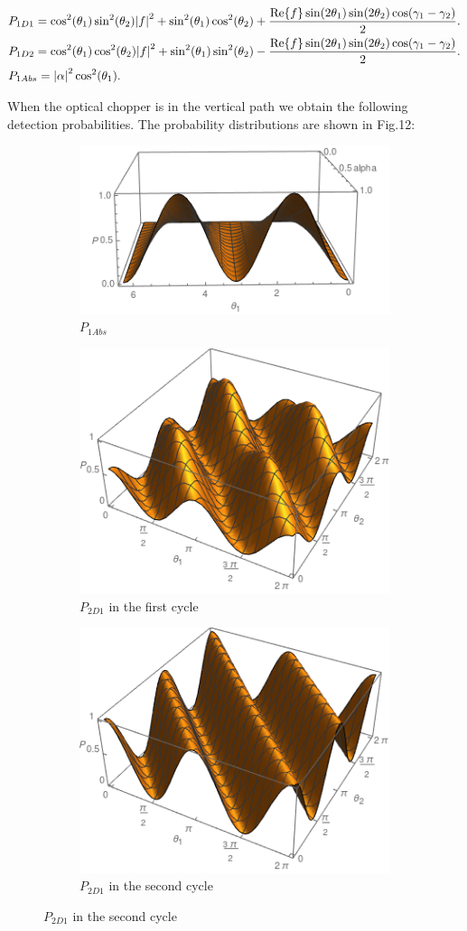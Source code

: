 \documentclass[12pt]{article}
\begin{document}
\begin{align}
&P_{1D1}=\cos^2(\theta_{1})\sin^2(\theta_{2})\abs{f}^2+ \sin^2(\theta_{1})\cos^2(\theta_{2})+\frac{\Re{f} \sin(2\theta_{1})\sin(2\theta_{2})\cos(\gamma_{1}-\gamma_{2})}{2}.\\
&P_{1D2}=\cos^2(\theta_{1})\cos^2(\theta_{2})\abs{f}^2+ \sin^2(\theta_{1})\sin^2(\theta_{2})-\frac{\Re{f} \sin(2\theta_{1})\sin(2\theta_{2})\cos(\gamma_{1}-\gamma_{2})}{2}.\\
&P_{1Abs}=\abs{\alpha}^2 \cos^2(\theta_{1}).
\end{align}


When the optical chopper is in the vertical path we obtain the following detection probabilities. The probability distributions are shown in Fig.12:

\begin{figure}[!h]
\centering
\begin{subfigure}[b]{0.40\linewidth}
\includegraphics[width=\linewidth,height=3 cm]{images/pcabs.png}
\caption{$P_{1Abs}$}
\label{fig:BS1}
\end{subfigure}
\begin{subfigure}[b]{0.40\linewidth}
\includegraphics[width=\linewidth,height=3 cm]{images/pcd21.png}
\caption{$P_{2D1}$ in the first cycle }
\label{fig:BS1}
\end{subfigure}
\begin{subfigure}[b]{0.40\linewidth}
\includegraphics[width=\linewidth,height=3 cm]{images/pcd22.png}
\caption{$P_{2D1}$ in the second cycle}
\label{fig:BS1}
\end{subfigure}

\end{figure}
\end{document}
